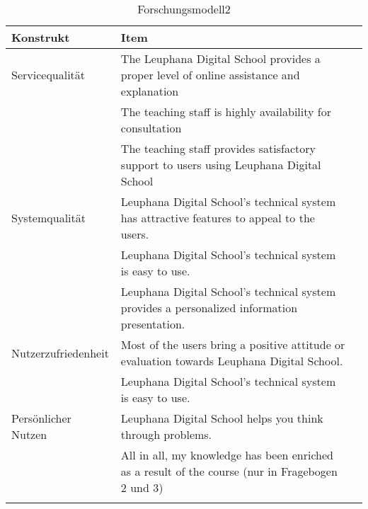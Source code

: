 
\begin{table}[ht] 
\caption{Forschungsmodell2}
\label{tab:Forschungsmodell} 
\begin{tabular}{@{}lp{12cm}r@{}} \toprule

\textbf{Konstrukt} & \textbf{Item} \\ \midrule

Servicequalität & The Leuphana Digital School provides a proper level of online assistance and explanation \\ \addlinespace
& The teaching staff is highly availability for consultation\\\addlinespace
& \parbox[t]{12cm}{The teaching staff provides satisfactory support to users using Leuphana Digital School} \\ \addlinespace
Systemqualität & \parbox[t]{12cm}{Leuphana Digital School’s technical system has attractive features to appeal to the users.}\\ \addlinespace
& Leuphana Digital School’s technical system is easy to use. \\\addlinespace
& \parbox[t]{12cm}{Leuphana Digital School’s technical system provides a personalized information presentation.} \\ \addlinespace
Nutzerzufriedenheit & \parbox[t]{12cm}{Most of the users bring a positive attitude or evaluation towards Leuphana Digital School.} \\ \addlinespace
& Leuphana Digital School’s technical system is easy to use.  \\ \addlinespace 
Persönlicher Nutzen & \parbox[t]{12cm}{Leuphana Digital School helps you think through problems.} \\ \addlinespace 
& \parbox[t]{12cm}{All in all, my knowledge has been enriched as a result of the course (nur in Fragebogen 2 und 3)} \\ \addlinespace 
  \bottomrule

\end{tabular}	
\end{table}

